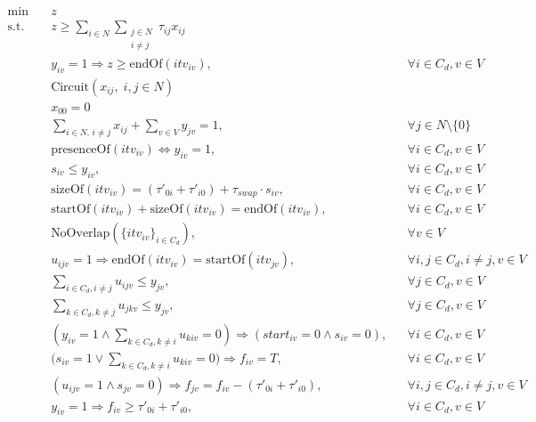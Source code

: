 \documentclass[3p, authoryear, 11pt]{elsarticle}
\begin{document}
\begin{align}
    \text{min} \quad & z \label{eq:tm_obj} \\
    \text{s.t.} \quad 
    & z \ge \sum_{i \in N} \sum_{\substack{j \in N\\ i \ne j}} \tau_{ij} x_{ij} \label{eq:tm_truck_makespan} \\[3pt]
    & y_{iv}=1 \Rightarrow z \ge \text{endOf}(itv_{iv}), && \forall i \in C_d, v \in V \label{eq:tm_drone_makespan} \\[3pt]
    & \text{Circuit}(x_{ij},\; i,j \in N) \label{eq:tm_truck_circuit} \\[3pt]
    & x_{00} = 0 \label{eq:tm_depot_loop} \\[3pt]
    & \sum_{i \in N,\, i \neq j} x_{ij} + \sum_{v \in V} y_{jv} = 1, && \forall j \in N \setminus \{0\} \label{eq:tm_assignment} \\[6pt]
    & \text{presenceOf}(itv_{iv}) \Leftrightarrow y_{iv} = 1, && \forall i \in C_d, v \in V \label{eq:tm_presence} \\[2pt]
    & s_{iv} \le y_{iv}, && \forall i \in C_d, v \in V \label{eq:tm_swap_logic} \\[2pt]
    & \text{sizeOf}(itv_{iv}) = (\tau'_{0i} + \tau'_{i0}) + \tau_{swap} \cdot s_{iv}, && \forall i \in C_d, v \in V \label{eq:tm_size} \\[2pt]
    & \text{startOf}(itv_{iv}) + \text{sizeOf}(itv_{iv}) = \text{endOf}(itv_{iv}), && \forall i \in C_d, v \in V \label{eq:tm_time_consistency} \\[2pt]
    & \text{NoOverlap}(\{itv_{iv}\}_{i \in C_d}), && \forall v \in V \label{eq:tm_no_overlap} \\[2pt]
    & u_{ijv} = 1 \Rightarrow \text{endOf}(itv_{iv}) = \text{startOf}(itv_{jv}), && \forall i,j \in C_d, i \neq j, v \in V \label{eq:tm_precedence} \\[2pt]
    &\sum_{i \in C_d, i \neq j} u_{ijv} \le y_{jv}, && \forall j \in C_d, v \in V \label{eq:tm_flow_in} \\
    &\sum_{k \in C_d, k \neq j} u_{jkv} \le y_{jv}, && \forall j \in C_d, v \in V \label{eq:tm_flow_out} \\[2pt]
    & \left( y_{iv} = 1 \land \sum_{k \in C_d, k \neq i} u_{kiv} = 0 \right) \Rightarrow (start_{iv} = 0 \land s_{iv} = 0), && \forall i \in  C_d, v \in V \label{eq:tm_start_init} \\[2pt]
    & \Big(s_{iv} = 1 \lor \sum_{k \in C_d, k \neq i} u_{kiv} = 0 \Big) \Rightarrow f_{iv} = T, && \forall i \in C_d, v \in V \label{eq:tm_reset} \\[2pt]
    & (u_{ijv}=1 \land s_{jv}=0) \Rightarrow f_{jv} = f_{iv} - (\tau'_{0i}+\tau'_{i0}), && \forall i,j \in C_d, i \neq j, v \in V \label{eq:tm_balance} \\[2pt]
    & y_{iv}=1 \Rightarrow f_{iv} \ge \tau'_{0i}+\tau'_{i0}, && \forall i \in C_d, v \in V \label{eq:tm_feasibility}
\end{align}
\end{document}
